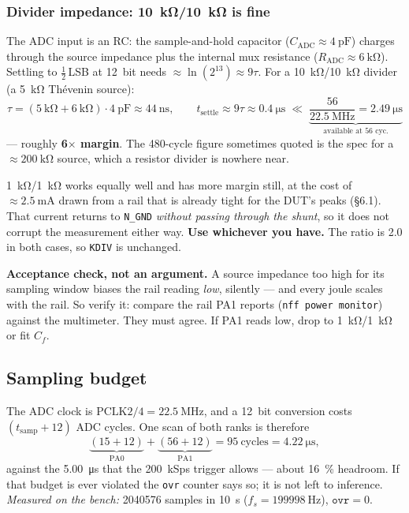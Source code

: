 \documentclass[11pt,a4paper]{article}
\begin{document}
\subsubsection*{Divider impedance: \SI{10}{\kilo\ohm}/\SI{10}{\kilo\ohm} is fine}

The ADC input is an RC: the sample-and-hold capacitor ($C_\text{ADC}\approx\SI{4}{\pico\farad}$)
charges through the source impedance plus the internal mux resistance
($R_\text{ADC}\approx\SI{6}{\kilo\ohm}$). Settling to $\tfrac12$\,LSB at \SI{12}{bit} needs
$\approx\ln(2^{13}) \approx 9\tau$. For a \SI{10}{\kilo\ohm}/\SI{10}{\kilo\ohm} divider
(a \SI{5}{\kilo\ohm} Th\'evenin source):
\[
\tau = (\SI{5}{\kilo\ohm} + \SI{6}{\kilo\ohm})\cdot\SI{4}{\pico\farad} \approx \SI{44}{\nano\second},
\qquad
t_\text{settle} \approx 9\tau \approx \SI{0.4}{\micro\second}
\;\ll\;
\underbrace{\frac{56}{\SI{22.5}{\mega\hertz}} = \SI{2.49}{\micro\second}}_{\text{available at 56 cyc.}}
\]
--- roughly \textbf{6$\times$ margin}. The \num{480}-cycle figure sometimes quoted is the spec for
a $\approx\SI{200}{\kilo\ohm}$ source, which a resistor divider is nowhere near.

\medskip
\noindent
\SI{1}{\kilo\ohm}/\SI{1}{\kilo\ohm} works equally well and has more margin still, at the cost of
$\approx\SI{2.5}{\milli\ampere}$ drawn from a rail that is already tight for the DUT's peaks
(\S6.1). That current returns to \texttt{N\_GND} \emph{without passing through the shunt}, so it
does not corrupt the measurement either way. \textbf{Use whichever you have.} The ratio is
\num{2.0} in both cases, so \texttt{KDIV} is unchanged.

\medskip
\noindent
\textbf{Acceptance check, not an argument.} A source impedance too high for its sampling window
biases the rail reading \emph{low}, silently --- and every joule scales with the rail. So verify
it: compare the rail PA1 reports (\texttt{nff power monitor}) against the multimeter. They must
agree. If PA1 reads low, drop to \SI{1}{\kilo\ohm}/\SI{1}{\kilo\ohm} or fit $C_f$.

\subsection{Sampling budget}

The ADC clock is $\text{PCLK2}/4 = \SI{22.5}{\mega\hertz}$, and a \SI{12}{bit} conversion costs
$(t_\text{samp} + 12)$ ADC cycles. One scan of both ranks is therefore
\[
\underbrace{(15+12)}_{\text{PA0}} + \underbrace{(56+12)}_{\text{PA1}} = \num{95}\ \text{cycles}
= \SI{4.22}{\micro\second},
\]
against the \SI{5.00}{\micro\second} that the \SI{200}{kSps} trigger allows --- about
\SI{16}{\percent} headroom. If that budget is ever violated the \texttt{ovr} counter says so;
it is not left to inference. \emph{Measured on the bench:} \num{2040576} samples in
\SI{10}{\second} ($f_s = \SI{199998}{\hertz}$), $\texttt{ovr} = 0$.
\end{document}
